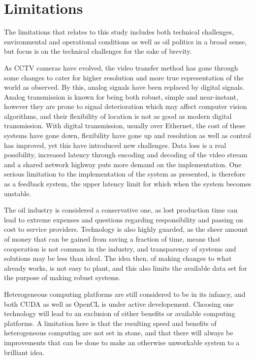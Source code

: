 \section{Limitations}
The limitations that relates to this study includes both technical challenges, environmental and operational conditions as well as oil politics in a broad sense, but focus is on the technical challenges for the sake of brevity.

As CCTV cameras have evolved, the video transfer method has gone through some changes to cater for higher resolution and more true representation of the world as observed. By this, analog signals have been replaced by digital signals. Analog transmission is known for being both robust, simple and near-instant, however they are prone to signal deterioration which may affect computer vision algorithms, and their flexibility of location is not as good as modern digital transmission. With digital transmission, usually over Ethernet, the cost of these systems have gone down, flexibility have gone up and resolution as well as control has improved, yet this have introduced new challenges. Data loss is a real possibility, increased latency through encoding and decoding of the video stream and a shared network highway puts more demand on the implementation. One serious limitation to the implementation of the system as presented, is therefore as a feedback system, the upper latency limit for which when the system becomes unstable.

The oil industry is considered a conservative one, as lost production time can lead to extreme expenses and questions regarding responsibility and passing on cost to service providers. Technology is also highly guarded, as the sheer amount of money that can be gained from saving a fraction of time, means that cooperation is not common in the industry, and transparency of systems and solutions may be less than ideal. The idea then, of making changes to what already works, is not easy to plant, and this also limits the available data set for the purpose of making robust systems.

Heterogeneous computing platforms are still considered to be in its infancy, and both CUDA as well as OpenCL is under active developement. Choosing one technology will lead to an exclusion of either benefits or available computing platforms. A limitation here is that the resulting speed and benefits of heterogeneous computing are not set in stone, and that there will always be improvements that can be done to make an otherwise unworkable system to a brilliant idea.

